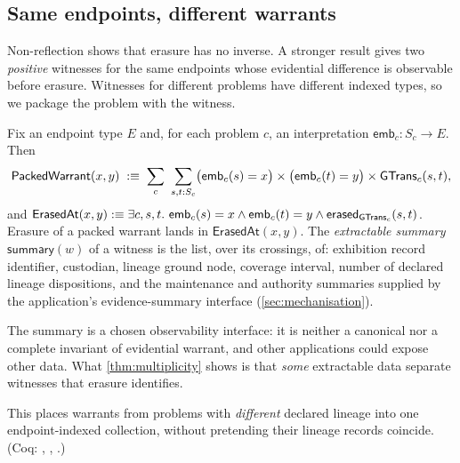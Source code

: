 \subsection{Same endpoints, different warrants}\label{sec:multiplicity}
Non-reflection shows that erasure has no inverse. A stronger result gives two \emph{positive} witnesses for the same endpoints whose evidential difference is observable before erasure. Witnesses for different problems have different indexed types, so we package the problem with the witness.
\begin{defi}\label{def:packed}
Fix an endpoint type $E$ and, for each problem $c$, an interpretation $\mathsf{emb}_c : S_c \to E$. Then
\[
\mathsf{PackedWarrant}(x,y) \;:\equiv\; \sum_{c}\ \sum_{s,t : S_c} \bigl(\mathsf{emb}_c(s) = x\bigr) \times \bigl(\mathsf{emb}_c(t) = y\bigr) \times \mathsf{GTrans}_c(s,t),
\]
and $\mathsf{ErasedAt}(x,y) :\equiv \exists c, s, t.\ \mathsf{emb}_c(s) = x \wedge \mathsf{emb}_c(t) = y \wedge \mathsf{erased}_{\mathsf{GTrans}_c}(s,t)$. Erasure of a packed warrant lands in $\mathsf{ErasedAt}(x,y)$. The \emph{extractable summary} $\mathsf{summary}(w)$ of a witness is the list, over its crossings, of: exhibition record identifier, custodian, lineage ground node, coverage interval, number of declared lineage dispositions, and the maintenance and authority summaries supplied by the application's evidence-summary interface (\cref{sec:mechanisation}).
\end{defi}
The summary is a chosen observability interface: it is neither a canonical nor a complete invariant of evidential warrant, and other applications could expose other data. What \cref{thm:multiplicity} shows is that \emph{some} extractable data separate witnesses that erasure identifies.

This places warrants from problems with \emph{different} declared lineage into one endpoint-indexed collection, without pretending their lineage records coincide. (Coq: , , .)

